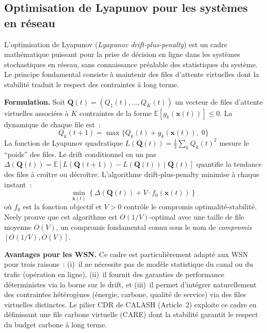 \subsection{Optimisation de Lyapunov pour les systèmes en réseau}

L'optimisation de Lyapunov (\emph{Lyapunov drift-plus-penalty}) \cite{neely2010lyapunov} est un cadre mathématique puissant pour la prise de décision en ligne dans les systèmes stochastiques en réseau, sans connaissance préalable des statistiques du système. Le principe fondamental consiste à maintenir des files d'attente virtuelles dont la stabilité traduit le respect des contraintes à long terme.

\textbf{Formulation.} Soit $\mathbf{Q}(t) = (Q_1(t), \ldots, Q_K(t))$ un vecteur de files d'attente virtuelles associées à $K$ contraintes de la forme $\mathbb{E}[g_k(\mathbf{x}(t))] \leq 0$. La dynamique de chaque file est~:
\begin{equation}\label{eq:virtual-queue}
    Q_k(t+1) = \max\{Q_k(t) + g_k(\mathbf{x}(t)),\; 0\}
\end{equation}
La fonction de Lyapunov quadratique $L(\mathbf{Q}(t)) = \frac{1}{2}\sum_k Q_k(t)^2$ mesure le ``poids'' des files. Le drift conditionnel en un pas $\Delta(\mathbf{Q}(t)) = \mathbb{E}[L(\mathbf{Q}(t+1)) - L(\mathbf{Q}(t)) \mid \mathbf{Q}(t)]$ quantifie la tendance des files à croître ou décroître. L'algorithme drift-plus-penalty minimise à chaque instant~:
\begin{equation}\label{eq:dpp-general}
    \min_{\mathbf{x}(t)} \left\{ \Delta(\mathbf{Q}(t)) + V \cdot f_0(\mathbf{x}(t)) \right\}
\end{equation}
où $f_0$ est la fonction objectif et $V > 0$ contrôle le compromis optimalité-stabilité. Neely \cite{neely2010lyapunov} prouve que cet algorithme est $O(1/V)$-optimal avec une taille de file moyenne $O(V)$, un compromis fondamental connu sous le nom de \emph{compromis $[O(1/V), O(V)]$}.

\textbf{Avantages pour les WSN.} Ce cadre est particulièrement adapté aux WSN pour trois raisons~: (i)~il ne nécessite pas de modèle statistique du canal ou du trafic (opération en ligne), (ii)~il fournit des garanties de performance déterministes via la borne sur le drift, et (iii)~il permet d'intégrer naturellement des contraintes hétérogènes (énergie, carbone, qualité de service) via des files virtuelles distinctes. Le pilier CDR de CALASH (Article~2) exploite ce cadre en définissant une file carbone virtuelle (CARE) dont la stabilité garantit le respect du budget carbone à long terme.

